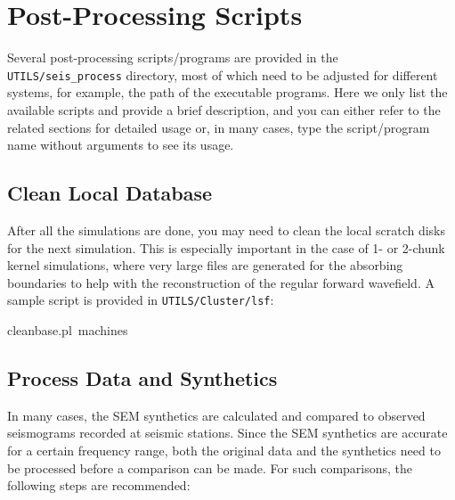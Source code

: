 \chapter{Post-Processing Scripts}

Several post-processing scripts/programs are provided in the \texttt{UTILS/seis\_process}
directory, most of which need to be adjusted for different
systems, for example, the path of the executable programs. Here we
only list the available scripts and provide a brief description, and
you can either refer to the related sections for detailed usage or,
in many cases, type the script/program name without arguments
to see its usage.


\section{Clean Local Database}

After all the simulations are done, you may need to clean the local
scratch disks for the next simulation. This is especially important
in the case of 1- or 2-chunk kernel simulations, where very large files
are generated for the absorbing boundaries to help with the reconstruction
of the regular forward wavefield. A sample script is provided in \texttt{UTILS/Cluster/lsf}:

\begin{lyxcode}
cleanbase.pl~machines
\end{lyxcode}

\section{Process Data and Synthetics}\label{sec:Process-data-and-syn}

In many cases, the SEM synthetics are calculated and compared to observed
seismograms recorded at seismic stations. Since the SEM synthetics
are accurate for a certain frequency range, both the original data
and the synthetics need to be processed before a comparison can be
made. For such comparisons, the following steps are recommended:

